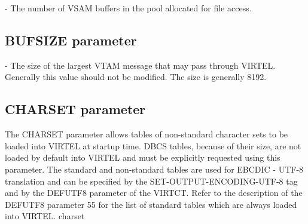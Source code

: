 \documentclass[letterpaper,10pt,english]{sphinxmanual}
\begin{document}
 - The number of VSAM buffers in the pool allocated for file access.


\subsection{BUFSIZE parameter}
\label{\detokenize{Installation_Guide:index-41}}\label{\detokenize{Installation_Guide:bufsize-parameter}}
\begin{sphinxVerbatim}[commandchars=\\\{\}]
 
\end{sphinxVerbatim}

 - The size of the largest VTAM message that may pass through VIRTEL. Generally this value should not be modified. The size is generally 8192.


\subsection{CHARSET parameter}
\label{\detokenize{Installation_Guide:charset-parameter}}\label{\detokenize{Installation_Guide:index-42}}
\begin{sphinxVerbatim}[commandchars=\\\{\}]
 
\end{sphinxVerbatim}

The CHARSET parameter allows tables of non-standard character sets to be loaded into VIRTEL at startup time. DBCS tables, because of their size, are not loaded by default into VIRTEL and must be explicitly requested using this parameter. The standard and non-standard tables are used for EBCDIC - UTF-8 translation and can be specified by the SET-OUTPUT-ENCODING-UTF-8 tag and by the DEFUTF8 parameter of the VIRTCT. Refer to the description of the DEFUTF8 parameter 55 for the list of standard tables which are always loaded into VIRTEL.
charset
\end{document}
